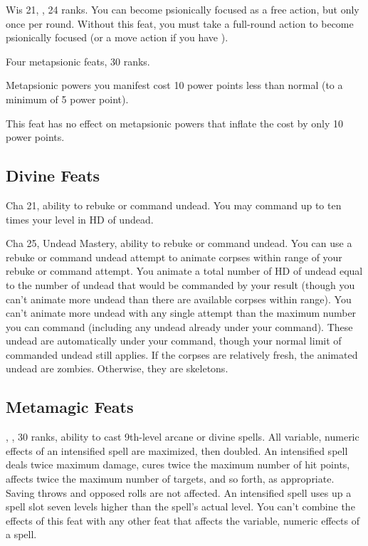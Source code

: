 {}
{Wis 21, ,  24 ranks.}
{You can become psionically focused as a free action, but only once per round.}
{Without this feat, you must take a full-round action to become psionically focused (or a move action if you have ).}
{}

{Four metapsionic feats,  30 ranks.}
{Metapsionic powers you manifest cost 10 power points less than normal (to a minimum of 5 power point).

This feat has no effect on metapsionic powers that inflate the cost by only 10 power points.}




\subsection{Divine Feats}
{Cha 21, ability to rebuke or command undead.}
{You may command up to ten times your level in HD of undead.}

{Cha 25, Undead Mastery, ability to rebuke or command undead.}
{You can use a rebuke or command undead attempt to animate corpses within range of your rebuke or command attempt. You animate a total number of HD of undead equal to the number of undead that would be commanded by your result (though you can’t animate more undead than there are available corpses within range). You can’t animate more undead with any single attempt than the maximum number you can command (including any undead already under your command). These undead are automatically under your command, though your normal limit of commanded undead still applies. If the corpses are relatively fresh, the animated undead are zombies. Otherwise, they are skeletons.}




\subsection{Metamagic Feats}
{, ,  30 ranks, ability to cast 9th-level arcane or divine spells.}
{All variable, numeric effects of an intensified spell are maximized, then doubled. An intensified spell deals twice maximum damage, cures twice the maximum number of hit points, affects twice the maximum number of targets, and so forth, as appropriate. Saving throws and opposed rolls are not affected. An intensified spell uses up a spell slot seven levels higher than the spell's actual level. You can't combine the effects of this feat with any other feat that affects the variable, numeric effects of a spell.}



